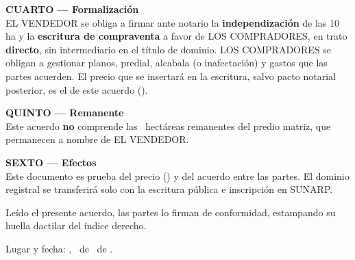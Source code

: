 \documentclass[12pt,a4paper]{article}
\begin{document}
\vspace{0.45em}
\noindent\textbf{CUARTO --- Formalización}\\[0.15em]
EL VENDEDOR se obliga a firmar ante notario la \textbf{independización} de las 10 ha y la \textbf{escritura de compraventa} a favor de LOS COMPRADORES, en trato \textbf{directo}, sin intermediario en el título de dominio. LOS COMPRADORES se obligan a gestionar planos, predial, alcabala (o inafectación) y gastos que las partes acuerden. El precio que se insertará en la escritura, salvo pacto notarial posterior, es el de este acuerdo (\MontoPago).

\vspace{0.45em}
\noindent\textbf{QUINTO --- Remanente}\\[0.15em]
Este acuerdo \textbf{no} comprende las \AreaRemanenteHa\ hectáreas remanentes del predio matriz, que permanecen a nombre de EL VENDEDOR.

\vspace{0.45em}
\noindent\textbf{SEXTO --- Efectos}\\[0.15em]
Este documento es prueba del precio (\MontoPago) y del acuerdo entre las partes. El dominio registral se transferirá solo con la escritura pública e inscripción en SUNARP.

\vspace{0.85em}
\noindent Leído el presente acuerdo, las partes lo firman de conformidad, estampando su huella dactilar del índice derecho.

\vspace{1.1em}
\noindent Lugar y fecha: \textbf{\LugarOtorgamiento}, \DiaOtorgamiento\ de \MesOtorgamiento\ de \AnioOtorgamiento.

\vspace{1.35em}

\vspace{1.1em}
\\[0.35em]
\noindent
{}
\hfill
{}
\end{document}

